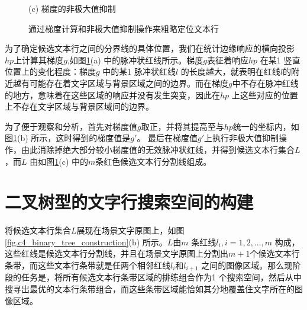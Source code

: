 \begin{figure}[!h]
\begin{minipage}[t]{0.32\linewidth}
        \centerline{\small (c) 梯度的非极大值抑制}
        \end{minipage}
        \caption{通过梯度计算和非极大值抑制操作来粗略定位文本行}
        \label{fig.c4_candidate_line_construction}
        \end{figure}

        为了确定候选文本行之间的分界线的具体位置，我们在统计边缘响应的横向投影$hp$上计算其梯度$g$,如图\ref{fig.c4_candidate_line_construction}(a) 中的脉冲状红线所示。梯度$g$表征着响应$hp$ 在某1 竖直位置上的变化程度：梯度$g$ 中的某1 脉冲状红线$l$ 的长度越大，就表明在红线$l$的附近越有可能存在着文字区域与背景区域之间的边界。而在梯度$g$中不存在脉冲红线的地方，意味着在这些区域的响应并没有发生突变，因此在$hp$ 上这些对应的位置上不存在文字区域与背景区域间的边界。

        为了便于观察和分析，首先对梯度值$g$取正，并将其提高至与$hp$统一的坐标内，如图\ref{fig.c4_candidate_line_construction}(b) 所示，这时得到的梯度值是$g$$'$。 最后在梯度值$g$$'$上执行非极大值抑制操作，由此消除掉绝大部分较小梯度值的无效脉冲状红线，并得到候选文本行集合$L$，而$L$ 由如图\ref{fig.c4_candidate_line_construction}(c) 中的$m$条红色候选文本行分割线组成。

    \section{二叉树型的文字行搜索空间的构建}

    将候选文本行集合$L$展现在场景文字原图上，如图\ref{fig.c4_binary_tree_construction}(b) 所示。$L$由$m$ 条红线$l_i, i=1,2,...,m$ 构成，这些红线是候选文本行分割线，并且在场景文字原图上分割出$m+1$个候选文本行条带，而这些文本行条带就是任两个相邻红线$l_i$和$l_{i+1}$ 之间的图像区域。那么现阶段的任务是，将所有候选文本行条带区域的排练组合作为1 个搜索空间，然后从中搜寻出最优的文本行条带组合，而这些条带区域能恰如其分地覆盖住文字所在的图像区域。

